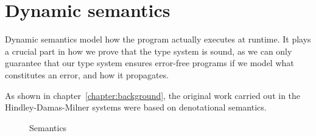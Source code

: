 \section{Dynamic semantics}
Dynamic semantics model how the program actually executes at
runtime. It plays a crucial part in how we prove that the type system
is sound, as we can only guarantee that our type system ensures
error-free programs if we model what constitutes an error, and how it
propagates.

As shown in chapter~\ref{chapter:background}, the original work carried out in the Hindley-Damas-Milner systems were
based on denotational semantics.

\begin{figure}
  \caption{Semantics}
\end{figure}

